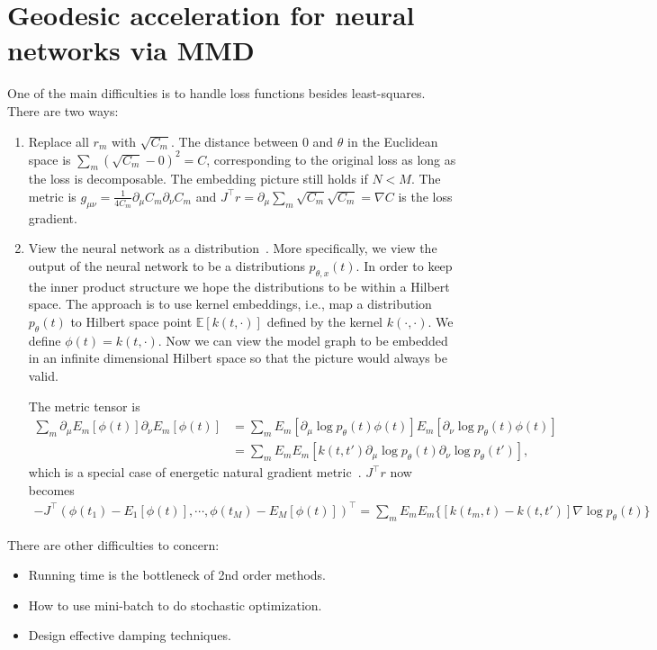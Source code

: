 \documentclass{amsart}
\theoremstyle{definition}
\theoremstyle{remark}
\numberwithin{equation}{section}
\newcommand{\T}{\intercal}
\newcommand{\E}[1]{\mathbb{E}\left[#1\right]}
\begin{document}
\section{Geodesic acceleration for neural networks via MMD}
One of the main difficulties is to handle loss functions besides least-squares. There are two ways:
\begin{enumerate}
	\item Replace all $r_m$ with $\sqrt{C_m}$. The distance between $0$ and $\theta$ in the Euclidean space is $\sum_m (\sqrt{C_m}-0)^2 = C$, corresponding to the original loss as long as the loss is decomposable. The embedding picture still holds if $N < M$. The metric is $g_{\mu\nu} = \frac{1}{4C_m} \partial_\mu C_m \partial_\nu C_m$ and $J^\T r = \partial_\mu \sum_m \sqrt{C_m} \sqrt{C_m} = \nabla C$ is the loss gradient.
	\item View the neural network as a distribution~\cite{RevBengio}. More specifically, we view the output of the neural network to be a distributions $p_{\theta,x}(t)$. In order to keep the inner product structure we hope the distributions to be within a Hilbert space. The approach is to use kernel embeddings, i.e., map a distribution $p_\theta(t)$ to Hilbert space point $\E{k(t,\cdot)}$ defined by the kernel $k(\cdot,\cdot)$. We define $\phi(t) = k(t,\cdot)$. Now we can view the model graph to be embedded in an infinite dimensional Hilbert space so that the picture would always be valid. 
	
	The metric tensor is 
	\begin{align*}
		\sum_m \partial_\mu E_m[\phi(t)] \partial_\nu E_m[\phi(t)] &= \sum_m E_m[\partial_\mu \log p_\theta(t) \phi(t)] E_m[\partial_\nu \log p_\theta(t) \phi(t)]\\
		&= \sum_m E_m E_m[k(t,t')\partial_\mu \log p_\theta(t) \partial_\nu \log p_\theta(t')],
	\end{align*}
	which is a special case of energetic natural gradient metric~\cite{EnergeticThomas}. $J^\T r$ now becomes
	\begin{align*}
	-J^\T (\phi(t_1) - E_1[\phi(t)], \cdots, \phi(t_M) - E_M[\phi(t)])^\T = \sum_m E_mE_m\{[k(t_m, t) - k(t, t')] \nabla \log p_\theta(t)\}	
	\end{align*}	
\end{enumerate}

There are other difficulties to concern:
\begin{itemize}
	\item Running time is the bottleneck of 2nd order methods.
	\item How to use mini-batch to do stochastic optimization.
	\item Design effective damping techniques.
\end{itemize}
\end{document}
